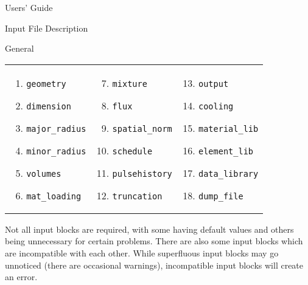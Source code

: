 \begin{chapter}{Users' Guide\label{app:user.guide}}
\begin{section}{Input File Description\label{app:user.input}}
\begin{subsection}{General}
      {
        \renewcommand{\baselinestretch}{1}\normalsize
        \noindent\begin{tabular}{p{2in}p{2in}p{2in}}
          \begin{enumerate}
          \item \texttt{geometry}
          \item \texttt{dimension}
          \item \texttt{major\_radius}
          \item \texttt{minor\_radius}
          \item \texttt{volumes}
          \item \texttt{mat\_loading}
          \end{enumerate} &
          \begin{enumerate}\setcounter{enumi}{6}
          \item \texttt{mixture}
          \item \texttt{flux}
          \item \texttt{spatial\_norm}
          \item \texttt{schedule}
          \item \texttt{pulsehistory}
          \item \texttt{truncation}
          \end{enumerate} &
          \begin{enumerate}\setcounter{enumi}{12}
          \item \texttt{output}
          \item \texttt{cooling}
          \item \texttt{material\_lib}
          \item \texttt{element\_lib}
          \item \texttt{data\_library}
          \item \texttt{dump\_file}
          \end{enumerate}
        \end{tabular}
        }

      Not all input blocks are required, with some having default
      values and others being unnecessary for certain problems.  There
      are also some input blocks which are incompatible with each
      other.  While superfluous input blocks may go unnoticed (there
      are occasional warnings), incompatible input blocks will create
      an error.


\end{subsection}
\end{section}
\end{chapter}
